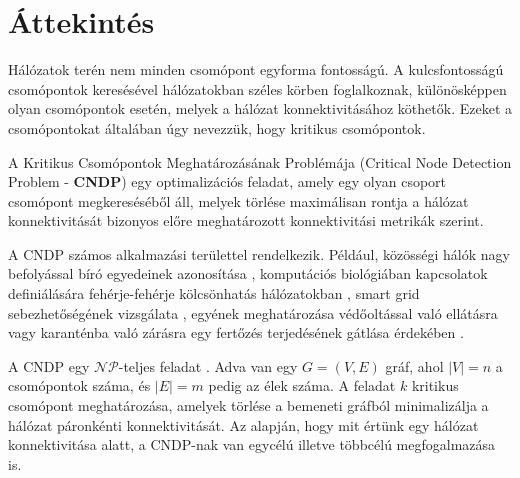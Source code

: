 \section{Áttekintés}\label{sec:ATTEKINTES}

Hálózatok terén nem minden csomópont egyforma fontosságú.
A kulcsfontosságú csomópontok keresésével hálózatokban széles körben foglalkoznak,
különösképpen olyan csomópontok esetén, melyek a hálózat konnektivitásához köthetők.
Ezeket a csomópontokat általában úgy nevezzük, hogy kritikus csomópontok.

A Kritikus Csomópontok Meghatározásának Problémája (Critical Node Detection Problem - \textbf{CNDP})
egy optimalizációs feladat, amely egy olyan csoport csomópont
megkereséséből áll, melyek törlése maximálisan rontja a hálózat
konnektivitását bizonyos előre meghatározott konnektivitási metrikák szerint.

A CNDP számos alkalmazási területtel rendelkezik.
Például, közösségi hálók nagy befolyással bíró egyedeinek azonosítása \cite{kempe2005influential},
komputációs biológiában kapcsolatok definiálására fehérje-fehérje kölcsönhatás hálózatokban \cite{boginski2009identifying, tomaino2012studying},
smart grid sebezhetőségének vizsgálata \cite{nguyen2013detecting},
egyének meghatározása védőoltással való ellátásra vagy karanténba való zárásra egy fertőzés terjedésének gátlása érdekében \cite{ventresca2013evaluation, ventresca2014randomized, aspnes2006inoculation}.

A CNDP egy $\mathcal{N}\mathcal{P}$-teljes feladat \cite{arulselvan2009detecting}. Adva van egy $G = (V, E)$ gráf, ahol $|V| = n$ a csomópontok száma,
és $|E| = m$ pedig az élek száma. A feladat $k$ kritikus csomópont meghatározása, amelyek törlése a bemeneti
gráfból minimalizálja a hálózat páronkénti konnektivitását. Az alapján, hogy mit értünk egy hálózat
konnektivitása alatt, a CNDP-nak van egycélú illetve többcélú megfogalmazása is.
